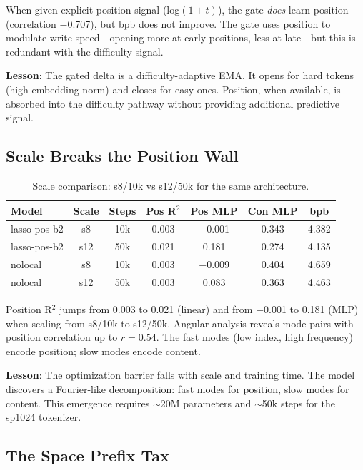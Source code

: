 \documentclass[11pt,a4paper]{article}
\begin{document}
When given explicit position signal (log$(1+t)$), the gate \emph{does} learn position (correlation $-$0.707), but bpb does not improve. The gate uses position to modulate write speed---opening more at early positions, less at late---but this is redundant with the difficulty signal.

\textbf{Lesson}: The gated delta is a difficulty-adaptive EMA. It opens for hard tokens (high embedding norm) and closes for easy ones. Position, when available, is absorbed into the difficulty pathway without providing additional predictive signal.

\subsection{Scale Breaks the Position Wall}

\begin{table}[h]
\centering
\caption{Scale comparison: s8/10k vs s12/50k for the same architecture.}
\begin{tabular}{lcccccc}
\toprule
Model & Scale & Steps & Pos R$^2$ & Pos MLP & Con MLP & bpb \\
\midrule
lasso-pos-b2 & s8 & 10k & 0.003 & $-$0.001 & 0.343 & 4.382 \\
lasso-pos-b2 & s12 & 50k & 0.021 & 0.181 & 0.274 & 4.135 \\
nolocal & s8 & 10k & 0.003 & $-$0.009 & 0.404 & 4.659 \\
nolocal & s12 & 50k & 0.003 & 0.083 & 0.363 & 4.463 \\
\bottomrule
\end{tabular}
\label{tab:scale}
\end{table}

Position R$^2$ jumps from 0.003 to 0.021 (linear) and from $-$0.001 to 0.181 (MLP) when scaling from s8/10k to s12/50k. Angular analysis reveals mode pairs with position correlation up to $r = 0.54$. The fast modes (low index, high frequency) encode position; slow modes encode content.

\textbf{Lesson}: The optimization barrier falls with scale and training time. The model discovers a Fourier-like decomposition: fast modes for position, slow modes for content. This emergence requires $\sim$20M parameters and $\sim$50k steps for the sp1024 tokenizer.

\subsection{The Space Prefix Tax}
\end{document}
